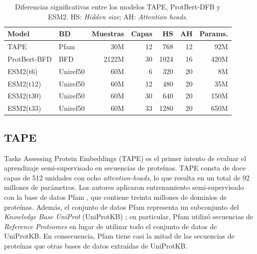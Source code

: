 \begin{table}[t]%
	\centering
	\caption{Diferencias significativas entre los modelos TAPE, ProtBert-DFB y ESM2. HS: \textit{Hidden size}; AH: \textit{Attention heads}.}
	\label{tab:pretrained}%
	\setlength{\tabcolsep}{0.5em} %
	{\renewcommand{\arraystretch}{1.5}%
	\begin{tabular}{llrrrrr}
		
		\textbf{Model}   & \textbf{BD} & \textbf{Muestras} & \textbf{Capas} & \textbf{HS} & \textbf{AH} & \textbf{Params.} \\
		\hline
		TAPE             & Pfam             & 30M                   & 12              & 768                  & 12                       & 92M                 \\
		ProtBert-BFD     & BFD              & 2122M                 & 30              & 1024                 & 16                       & 420M                \\
		ESM2(t6)  & Uniref50         & 60M                   & 6               & 320                  & 20                       & 8M                  \\
		ESM2(t12)  & Uniref50         & 60M                   & 12              & 480                  & 20                       & 35M                 \\
		ESM2(t30) & Uniref50         & 60M                   & 30              & 640                  & 20                       & 150M                \\
		ESM2(t33)  & Uniref50         & 60M                   & 33              & 1280                 & 20                       & 650M               \\
		
	\end{tabular}}
	
\end{table}

\subsection{TAPE}


Tasks Assessing Protein Embeddings (TAPE) \citep{rao2019evaluating} es el primer intento de evaluar el aprendizaje semi-supervisado en secuencias de proteínas. TAPE consta de doce capas de 512 unidades con ocho \textit{attention-heads}, lo que resulta en un total de 92 millones de parámetros. Los autores aplicaron entrenamiento semi-supervisado con la base de datos Pfam \citep{el2019pfam}, que contiene treinta millones de dominios de proteínas. Además, el conjunto de datos Pfam representa un subconjunto del \textit{Knowledge Base UniProt} (UniProtKB) \citep{uniprot2018uniprot}; en particular, Pfam utilizó secuencias de \textit{Reference Proteomes} \citep{finn2016pfam} en lugar de utilizar todo el conjunto de datos de UniProtKB. En consecuencia, Pfam tiene casi la mitad de las secuencias de proteínas que otras bases de datos extraídas de UniProtKB.


